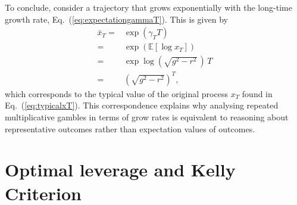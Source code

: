 \documentclass[11pt]{article}
\begin{document}
\begin{multicols}{2}
To conclude, consider a trajectory that grows exponentially with the long-time growth rate, Eq.~(\ref{eq:expectationgammaT}). This is given by
\begin{align*}
\bar{x}_T =& \exp \left( \gamma_T T\right)\\
=& \exp \left(\mathbb{E} \left[ \log x_T \right]\right)\\
=& \exp \log \left( \sqrt{g^2 - r^2}\,\right)\,T\\
=& \left( \sqrt{g^2 - r^2}\right)^T,
\end{align*}
which corresponds to the typical value of the original process $x_T$ found in Eq.~(\ref{eq:typicalxT}). This correspondence explains why analysing repeated multiplicative gambles in terms of grow rates is equivalent to reasoning about representative outcomes rather than expectation values of outcomes.

\section{Optimal leverage and Kelly Criterion}


\end{multicols}
\end{document}
